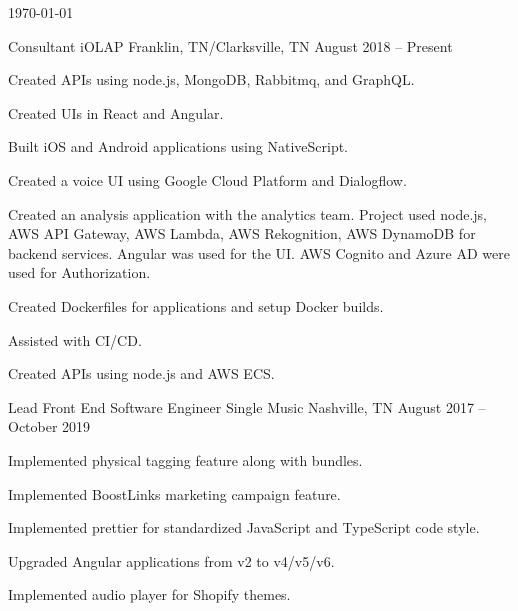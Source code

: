 \documentclass[letterpaper]{awesome-cv}
\begin{document}
\makecvfooter
{\today}
{}
{\thepage}

\makecvheader[C]

\begin{cventries}
  \cventry
    {Consultant}
    {iOLAP}
    {Franklin, TN/Clarksville, TN}
    {August 2018 – Present}
    {\begin{cvitems}
      \item {Created APIs using node.js, MongoDB, Rabbitmq, and GraphQL.}
      \item {Created UIs in React and Angular.}
      \item {Built iOS and Android applications using NativeScript.}
      \item {Created a voice UI using Google Cloud Platform and Dialogflow.}
      \item {Created an analysis application with the analytics team. Project used node.js, AWS API Gateway, AWS Lambda, AWS Rekognition, AWS DynamoDB for backend services. Angular was used for the UI. AWS Cognito and Azure AD were used for Authorization.}
      \item {Created Dockerfiles for applications and setup Docker builds.}
      \item {Assisted with CI/CD.}
      \item {Created APIs using node.js and AWS ECS.}
      \end{cvitems}}

  \cventry
    {Lead Front End Software Engineer}
    {Single Music}
    {Nashville, TN}
    {August 2017 – October 2019}
    {\begin{cvitems}
      \item {Implemented physical tagging feature along with bundles.}
      \item {Implemented BoostLinks marketing campaign feature.}
      \item {Implemented prettier for standardized JavaScript and TypeScript code style.}
      \item {Upgraded Angular applications from v2 to v4/v5/v6.}
      \item {Implemented audio player for Shopify themes.}
      \end{cvitems}}


\end{cventries}
\end{document}
